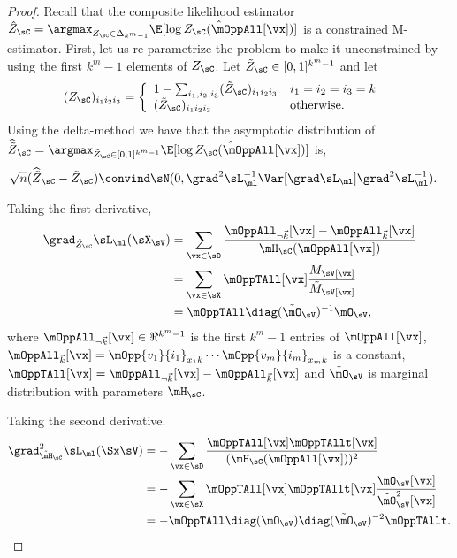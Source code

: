 \begin{proof}
  Recall that the composite likelihood estimator $\hat Z_\sC
  = \argmax_{Z_\sC \in \Delta_{k^m-1}} \hat\E[\log Z_\sC(\mOppAll[\vx])]$ is
  a constrained M-estimator.
  First, let us re-parametrize the problem to make it unconstrained by
  using the first $k^m - 1$ elements of $Z_\sC$.  
  Let $\tilde Z_\sC \in [0,1]^{k^m-1}$ and let 
  \begin{align*}
    (Z_\sC)_{i_1i_2i_3} &= \left\{
      \begin{array}{ll}
        1 - \sum_{i_1,i_2,i_3} (\tilde Z_\sC)_{i_1i_2i_3} & i_1 = i_2 = i_3 = k \\
        (\tilde Z_\sC)_{i_1i_2i_3} & \text{otherwise.}
        \end{array}
        \right.
  \end{align*}
  Using the delta-method \cite{vaart98asymptotic} we have that the asymptotic distribution of 
  $\widehat{{\tilde Z}}_\sC = \argmax_{\tilde Z_\sC \in [0,1]^{k^m-1}} \hat\E[\log Z_\sC(\mOppAll[\vx])]$ is,
  \begin{align*}
    \sqrt{n}(\widehat{\tilde{Z}}_{\sC} - \tilde{Z}_{\sC}) &\convind \sN( 0, \grad^2 \sL_\ml^{-1} \Var[\grad \sL_\ml] \grad^2 \sL_\ml^{-1}).
  \end{align*}

Taking the first derivative,
\begin{align}
  \grad_{\tilde Z_\sC} \sL_\ml(\sX_\sV) 
  &= \sum_{\vx \in \sD} \frac{\mOppAll_{\neg \vec k}[\vx] - \mOppAll_{\vec k}[\vx]}{\mH_\sC(\mOppAll[\vx]) } \nonumber \\ 
  &= \sum_{\vx \in \sX} \mOppTAll[\vx] \frac{M_\sV[\vx]}{\tilde M_\sV[\vx]} \nonumber \\ 
  &= \mOppTAll \diag(\tilde \mO_{\sV})^{-1} \mO_{\sV}, \label{eqn:lhood-grad}
\end{align}
where $\mOppAll_{\neg \vec k}[\vx] \in \Re^{k^m-1}$ is the first $k^m-1$
  entries of $\mOppAll[\vx]$, 
$\mOppAll_{\vec k}[\vx] = \mOpp{v_1}{i_1}_{x_1k} \cdots
  \mOpp{v_m}{i_m}_{x_mk}$ is a constant,
$\mOppTAll[\vx] = \mOppAll_{\neg \vec k}[\vx] - \mOppAll_{\vec k}[\vx]$
and $\tilde \mO_\sV$ is marginal distribution with parameters $\mH_\sC$.

Taking the second derivative.
\begin{align}
  \grad^2_{\tilde \mH_\sC} \sL_\ml(\Sx \sV) 
  &= - \sum_{\vx \in \sD} \frac{\mOppTAll[\vx] \mOppTAllt[\vx]}{(\mH_\sC(\mOppAll[\vx]))^2} \nonumber \\
  &= - \sum_{\vx \in \sX}\mOppTAll[\vx] \mOppTAllt[\vx] \frac{\mO_{\sV}[\vx]}{\tilde \mO_{\sV}^2[\vx]} \nonumber \\
  &= - \mOppTAll \diag(\mO_{\sV}) \diag(\tilde \mO_{\sV})^{-2} \mOppTAllt. \label{eqn:lhood-hess}%
\end{align}


\end{proof}
